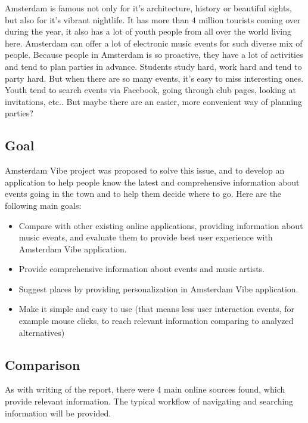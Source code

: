 \documentclass[12pt, a4paper, lithuanian]{article}
\begin{document}
  Amsterdam is famous not only for it's architecture, history or beautiful sights, but also for it's vibrant nightlife. It has more than 4 million tourists coming over during the year, it also has a lot of youth people from all over the world living here. Amsterdam can offer a lot of electronic music events for such diverse mix of people. 
  Because people in Amsterdam is so proactive, they have a lot of activities and tend to plan parties in advance. Students study hard, work hard and tend to party hard. But when there are so many events, it's easy to miss interesting ones. Youth tend to search events via Facebook, going through club pages, looking at invitations, etc.. But maybe there are an easier, more convenient way of planning parties? 

\subsection{Goal}

  Amsterdam Vibe project was proposed to solve this issue, and to develop an application to help people know the latest and comprehensive information about events going in the town and to help them decide where to go.
  Here are the following main goals:

\begin{itemize}

  \item Compare with other existing online applications, providing information about music events, and evaluate them to provide best user experience with Amsterdam Vibe application.

  \item Provide comprehensive information about events and music artists.

  \item Suggest places by providing personalization in Amsterdam Vibe application.

  \item Make it simple and easy to use (that means less user interaction events, for example mouse clicks, to reach relevant information comparing to analyzed alternatives)

\end{itemize}

\subsection{Comparison}

  As with writing of the report, there were 4 main online sources found, which provide relevant information. The typical workflow of navigating and searching information will be provided.
\end{document}
